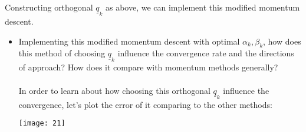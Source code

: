 \documentclass[11pt,letterpaper]{article}
\begin{document}
Constructing orthogonal $\underline q_k$ as above, we can implement this modified momentum descent.
\begin{tcolorbox}
    \begin{itemize}
        \item Implementing this modified momentum descent with optimal $\alpha_k, \beta_k$, how does this method of choosing $\underline q_k$ influence the convergence rate and the directions of approach? How does it compare with momentum methods generally?
        \\\\
        In order to learn about how choosing this orthogonal $\underline q_k$ influence the convergence, let's plot the error of it comparing to the other methods:
        \begin{center}
            \texttt{[image: 21]}
        \end{center}
    \end{itemize}
\end{tcolorbox}

\newpage
\end{document}
